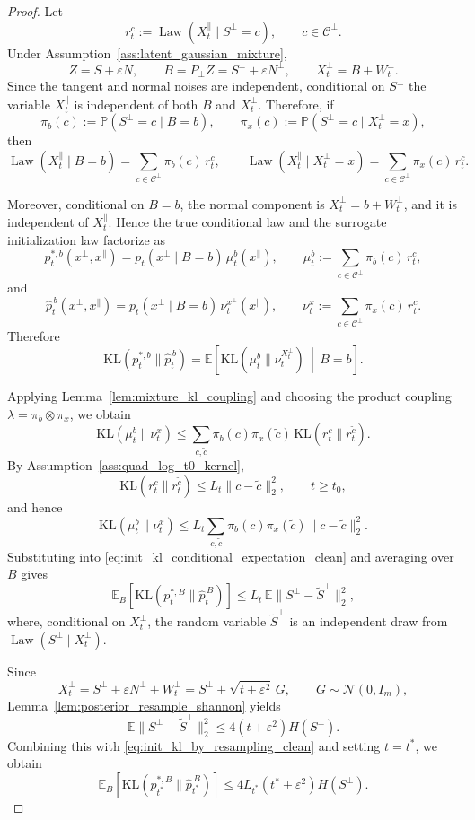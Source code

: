 \documentclass[twoside,11pt]{article}
\newcommand{\E}{\mathbb{E}}
\newcommand{\PP}{\mathbb{P}}
\newcommand{\Nc}{\mathcal{N}}
\newcommand{\Cc}{\mathcal{C}}
\newcommand{\KL}{\mathrm{KL}}
\newcommand{\Law}{\operatorname{Law}}
\numberwithin{equation}{section}
\begin{document}
\begin{proof}
Let
\[
r_t^c:=\Law(X_t^\parallel\mid S^\perp=c),
\qquad c\in\Cc^\perp.
\]
Under Assumption~\ref{ass:latent_gaussian_mixture},
\[
Z=S+\varepsilon N,
\qquad
B=P_\perp Z=S^\perp +\varepsilon N^\perp,
\qquad
X_t^\perp=B+W_t^\perp.
\]
Since the tangent and normal noises are independent, conditional on \(S^\perp\) the variable
\(X_t^\parallel\) is independent of both \(B\) and \(X_t^\perp\). Therefore, if
\[
\pi_b(c):=\PP(S^\perp=c\mid B=b),
\qquad
\pi_x(c):=\PP(S^\perp=c\mid X_t^\perp=x),
\]
then
\[
\Law(X_t^\parallel\mid B=b)=\sum_{c\in\Cc^\perp}\pi_b(c)\,r_t^c,
\qquad
\Law(X_t^\parallel\mid X_t^\perp=x)=\sum_{c\in\Cc^\perp}\pi_x(c)\,r_t^c.
\]

Moreover, conditional on \(B=b\), the normal component is \(X_t^\perp=b+W_t^\perp\), and it
is independent of \(X_t^\parallel\). Hence the true conditional law and the surrogate
initialization law factorize as
\[
p_t^{*,b}(x^\perp,x^\parallel)
=
p_t(x^\perp\mid B=b)\,\mu_t^b(x^\parallel),
\qquad
\mu_t^b:=\sum_{c\in\Cc^\perp}\pi_b(c)\,r_t^c,
\]
and
\[
\hat p_t^{\,b}(x^\perp,x^\parallel)
=
p_t(x^\perp\mid B=b)\,\nu_t^{x^\perp}(x^\parallel),
\qquad
\nu_t^x:=\sum_{c\in\Cc^\perp}\pi_x(c)\,r_t^c.
\]
Therefore
\begin{equation}
\label{eq:init_kl_conditional_expectation_clean}
\KL(p_t^{*,b}\|\hat p_t^{\,b})
=
\E\!\left[\KL(\mu_t^b\|\nu_t^{X_t^\perp})\,\middle|\,B=b\right].
\end{equation}

Applying Lemma~\ref{lem:mixture_kl_coupling} and choosing the product coupling
\(\lambda=\pi_b\otimes\pi_x\), we obtain
\[
\KL(\mu_t^b\|\nu_t^x)
\le
\sum_{c,\tilde c}\pi_b(c)\pi_x(\tilde c)\,\KL(r_t^c\|r_t^{\tilde c}).
\]
By Assumption~\ref{ass:quad_log_t0_kernel},
\[
\KL(r_t^c\|r_t^{\tilde c})\le L_t\|c-\tilde c\|_2^2,
\qquad t\ge t_0,
\]
and hence
\[
\KL(\mu_t^b\|\nu_t^x)
\le
L_t\sum_{c,\tilde c}\pi_b(c)\pi_x(\tilde c)\|c-\tilde c\|_2^2.
\]
Substituting into \eqref{eq:init_kl_conditional_expectation_clean} and averaging over \(B\)
gives
\begin{equation}
\label{eq:init_kl_by_resampling_clean}
\E_B\!\left[\KL(p_t^{*,B}\|\hat p_t^{\,B})\right]
\le
L_t\,\E\|S^\perp-\tilde S^\perp\|_2^2,
\end{equation}
where, conditional on \(X_t^\perp\), the random variable \(\tilde S^\perp\) is an
independent draw from \(\Law(S^\perp\mid X_t^\perp)\).

Since
\[
X_t^\perp
=
S^\perp+\varepsilon N^\perp+W_t^\perp
=
S^\perp+\sqrt{t+\varepsilon^2}\,G,
\qquad G\sim\Nc(0,I_m),
\]
Lemma~\ref{lem:posterior_resample_shannon} yields
\[
\E\|S^\perp-\tilde S^\perp\|_2^2
\le
4(t+\varepsilon^2)H(S^\perp).
\]
Combining this with \eqref{eq:init_kl_by_resampling_clean} and setting \(t=t^*\), we obtain
\begin{equation}
\label{eq:init_shannon_bound_clean}
\E_B\!\left[\KL(p_{t^*}^{*,B}\|\hat p_{t^*}^{\,B})\right]
\le
4L_{t^*}(t^*+\varepsilon^2)H(S^\perp).
\end{equation}


\end{proof}
\end{document}
